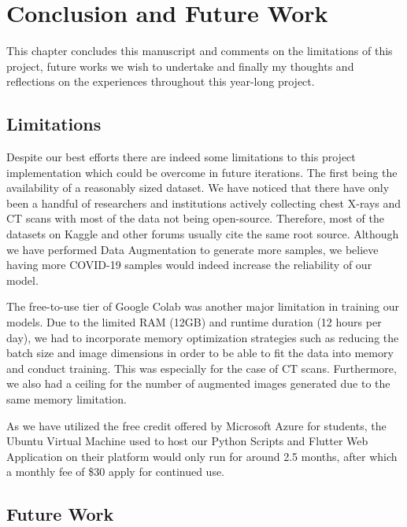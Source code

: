 \chapter{Conclusion and Future Work} \label{Conclusion and Future Works}

This chapter concludes this manuscript and comments on the limitations of this project, future works we wish to undertake and finally my thoughts and reflections on the experiences throughout this year-long project.

\section{Limitations}

Despite our best efforts there are indeed some limitations to this project implementation which could be overcome in future iterations. The first being the availability of a reasonably sized dataset. We have noticed that there have only been a handful of researchers and institutions actively collecting chest X-rays and CT scans with most of the data not being open-source. Therefore, most of the datasets on Kaggle and other forums usually cite the same root source. Although we have performed Data Augmentation to generate more samples, we believe having more COVID-19 samples would indeed increase the reliability of our model.

The free-to-use tier of Google Colab was another major limitation in training our models. Due to the limited RAM (12GB) and runtime duration (12 hours per day), we had to incorporate memory optimization strategies such as reducing the batch size and image dimensions in order to be able to fit the data into memory and conduct training. This was especially for the case of CT scans. Furthermore, we also had a ceiling for the number of augmented images generated due to the same memory limitation.

As we have utilized the free credit offered by Microsoft Azure for students, the Ubuntu Virtual Machine used to host our Python Scripts and Flutter Web Application on their platform would only run for around 2.5 months, after which a monthly fee of \$30 apply for continued use. 

\section{Future Work}


